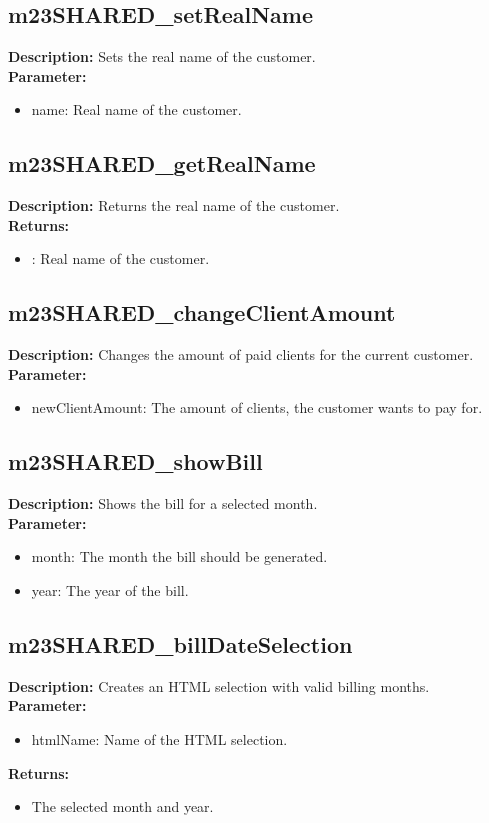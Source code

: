 \subsection{m23SHARED\_setRealName}
\textbf{Description:} Sets the real name of the customer.\\
\textbf{Parameter:}
\begin{itemize}
\item name: Real name of the customer.
\end{itemize}

\subsection{m23SHARED\_getRealName}
\textbf{Description:} Returns the real name of the customer.\\
\textbf{Returns:}
\begin{itemize}
\item : Real name of the customer.
\end{itemize}

\subsection{m23SHARED\_changeClientAmount}
\textbf{Description:} Changes the amount of paid clients for the current customer.\\
\textbf{Parameter:}
\begin{itemize}
\item newClientAmount: The amount of clients, the customer wants to pay for.
\end{itemize}

\subsection{m23SHARED\_showBill}
\textbf{Description:} Shows the bill for a selected month.\\
\textbf{Parameter:}
\begin{itemize}
\item month: The month the bill should be generated.
\item year: The year of the bill.
\end{itemize}

\subsection{m23SHARED\_billDateSelection}
\textbf{Description:} Creates an HTML selection with valid billing months.\\
\textbf{Parameter:}
\begin{itemize}
\item htmlName: Name of the HTML selection.
\end{itemize}
\textbf{Returns:}
\begin{itemize}
\item The selected month and year.
\end{itemize}

